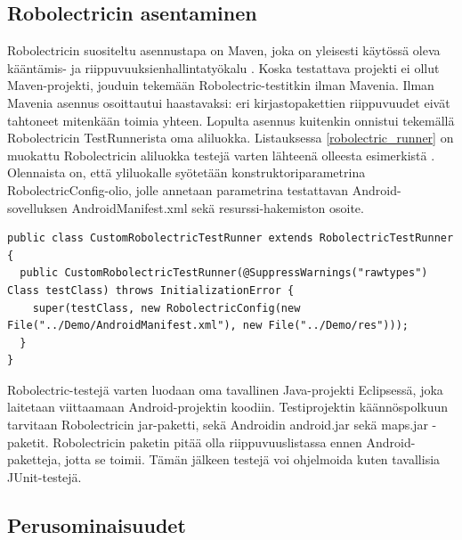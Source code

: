 \subsection{Robolectricin asentaminen}
\label{robolectric_install}

Robolectricin suositeltu asennustapa on Maven, joka on yleisesti käytössä oleva kääntämis- ja riippuvuuksienhallintatyökalu \cite{maven}. Koska testattava projekti ei ollut Maven-projekti, jouduin tekemään Robolectric-testitkin ilman Mavenia. Ilman Mavenia asennus osoittautui haastavaksi: eri kirjastopakettien riippuvuudet eivät tahtoneet mitenkään toimia yhteen. Lopulta asennus kuitenkin onnistui tekemällä Robolectricin TestRunnerista oma aliluokka. Listauksessa \ref{robolectric_runner} on muokattu Robolectricin aliluokka testejä varten lähteenä olleesta esimerkistä \cite{sample_runner}. Olennaista on, että yliluokalle syötetään konstruktoriparametrina RobolectricConfig-olio, jolle annetaan parametrina testattavan Android-sovelluksen AndroidManifest.xml sekä resurssi-hakemiston osoite.

\begin{lstlisting}[float,label=robolectric_runner,caption=CustomRobolectricTestRunner]
public class CustomRobolectricTestRunner extends RobolectricTestRunner {
  public CustomRobolectricTestRunner(@SuppressWarnings("rawtypes") Class testClass) throws InitializationError {
  	super(testClass, new RobolectricConfig(new File("../Demo/AndroidManifest.xml"), new File("../Demo/res")));
  }
}
\end{lstlisting}

Robolectric-testejä varten luodaan oma tavallinen Java-projekti Eclipsessä, joka laitetaan viittaamaan Android-projektin koodiin. Testiprojektin käännöspolkuun tarvitaan Robolectricin jar-paketti, sekä Androidin android.jar sekä maps.jar -paketit. Robolectricin paketin pitää olla riippuvuuslistassa ennen Android-paketteja, jotta se toimii. Tämän jälkeen testejä voi ohjelmoida kuten tavallisia JUnit-testejä.

\subsection{Perusominaisuudet}
\label{basic_unittests} 

